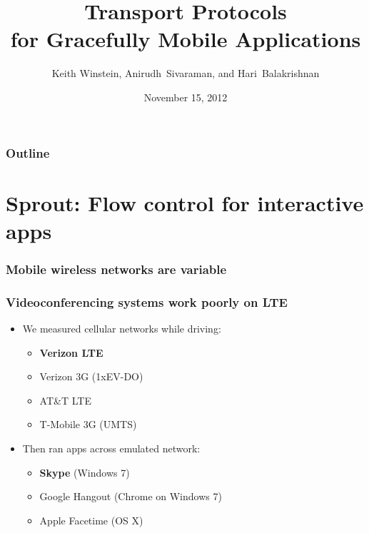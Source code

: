 \documentclass[svgnames]{beamer}
\title{Transport Protocols \\for Gracefully Mobile Applications}
\author{Keith Winstein, Anirudh~Sivaraman, and Hari~Balakrishnan}
\institute{M.I.T.~CSAIL}
\date{November 15, 2012}
\begin{document}
\begin{frame}[plain]

\titlepage

\end{frame}

\begin{frame}
\frametitle{Outline}
\tableofcontents{}

\end{frame}

\section{Sprout: Flow control for interactive apps}

\begin{frame}
\frametitle{Mobile wireless networks are variable}

{\small
\def\svgwidth{\columnwidth}
}

\end{frame}

\begin{frame}
\frametitle{Videoconferencing systems work poorly on LTE}

\begin{itemize}
\item We measured cellular networks while driving:

\begin{itemize}
\item {\color{red}\bf Verizon LTE}
\item Verizon 3G (1xEV-DO)
\item AT\&T LTE
\item T-Mobile 3G (UMTS)
\end{itemize}

\item Then ran apps across emulated network:

\begin{itemize}
\item {\color{red}\bf Skype} (Windows 7)
\item Google Hangout (Chrome on Windows 7)
\item Apple Facetime (OS X)
\end{itemize}

\end{itemize}

\end{frame}
\end{document}
